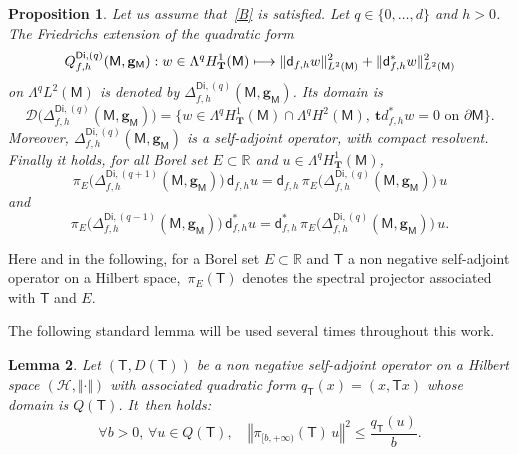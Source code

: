 \documentclass[JEP,XML,SOM,Unicode,NoEqCountersInSection,NoFloatCountersInSection,published]{cedram}
\newcommand\mto{\mathchoice{\longmapsto}{\mapsto}{\mapsto}{\mapsto}}
\newcommand{\mc}[1]{\mathcal{#1}}
\newcommand{\mbf}[1]{\mathbf{#1}}
\theoremstyle{plain}
\newtheorem{proposition}{Proposition}
\newtheorem{lemma}[proposition]{Lemma}
\theoremstyle{definition}
\begin{document}
\begin{proposition}\label{pr.defDfhD}
Let us assume that~\ref{B} is satisfied. Let $q\in \{0,\ldots,d\}$ and $h>0$. The Friedrichs extension of the quadratic form
\[
Q_{f,h}^{\mathsf{Di},(q)}(\mathsf M,\mbf g_{\mathsf M}): w\in \Lambda^qH^1_{\mbf T}(\mathsf M)\mto \Vert \mathsf d_{f,h}w \Vert_{L^2(\mathsf M)}^2 + \Vert\mathsf d_{f,h}^*w \Vert_{L^2(\mathsf M)}^2
\]
on $\Lambda^qL^2(\mathsf M)$
is denoted by $\Delta_{f,h}^{\mathsf{Di},(q)}(\mathsf M,\mbf g_{\mathsf M})$. Its domain is
\[
\mathcal D \bigl(\Delta_{f,h}^{\mathsf{Di},(q)}(\mathsf M,\mbf g_{\mathsf M})\bigr)=\big\{ w\in \Lambda^qH^1_{\mbf T}(\mathsf M)\cap\Lambda^qH^2(\mathsf M), \ \mbf
td^*_{f,h} w=0 \text{ on } \partial \mathsf M \big\}.
\]
Moreover, $\Delta^{\mathsf{Di},(q)}_{f,h}(\mathsf M,\mbf g_{\mathsf
M})$ is a self-adjoint operator, with compact resolvent. Finally it holds, for all Borel set $E\subset \mathbb R$ and $u\in \Lambda^qH^1_{\mbf T}(\mathsf M)$,
\begin{equation}\label{eq.complexeMM1}
\pi_{E}\bigl(\Delta_{f,h}^{\mathsf{Di},(q+1)}(\mathsf M,\mbf g_{\mathsf M})\bigr)\, \mathsf d_{f,h}u=\mathsf d_{f,h}\, \pi_{E}\bigl(\Delta_{f,h}^{\mathsf{Di},(q)}(\mathsf M,\mbf g_{\mathsf M})\bigr) \, u
\end{equation}
and
\begin{equation}\label{eq.complexeMM2}
\pi_{E}\bigl(\Delta_{f,h}^{\mathsf{Di},(q-1)}(\mathsf M,\mbf g_{\mathsf M})\bigr)\, \mathsf d_{f,h}^*u=\mathsf d_{f,h}^*\, \pi_{E}\bigl(\Delta_{f,h}^{\mathsf{Di},(q)}(\mathsf M,\mbf g_{\mathsf M}) \bigr)\, u.
\end{equation}
\end{proposition}

Here and in the following, for a Borel set $E\subset \mathbb R$ and
$\mathsf T$ a non negative self-adjoint operator on a Hilbert
space,~$\pi_{E}(\mathsf T)$ denotes the spectral projector associated
with $\mathsf T$ and $E$.

The following standard lemma will be used several times throughout this work.
\begin{lemma} \label{quadra}
Let $(\mathsf T,D\left (\mathsf T\right))$ be a non negative self-adjoint operator on a Hilbert space $\left(\mc H, \Vert\cdot\Vert\right)$ with associated quadratic form $q_{\mathsf T}(x)=(x,\mathsf Tx)$ whose domain is $Q\left (\mathsf T\right)$. It~then holds:
\[
\forall b>0, \, \forall u\in Q (\mathsf T), \quad \left\Vert \pi_{[b,+\infty)} (\mathsf T) \, u\right\Vert^2 \leq \frac{q_{\mathsf T}(u)}{b}.
\]
\end{lemma}
\end{document}
